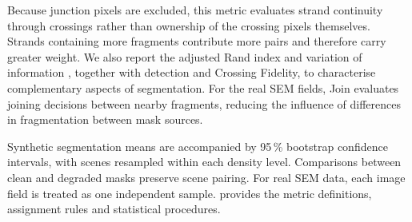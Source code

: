 Because junction pixels are excluded, this metric evaluates strand continuity
through crossings rather than ownership of the crossing pixels themselves.
Strands containing more fragments contribute more pairs and therefore carry
greater weight. We also report the adjusted Rand index and variation of
information \citep{hubert1985comparing,meila2007comparing}, together with
detection \Fone{} and Crossing Fidelity, to characterise complementary aspects
of segmentation. For the real SEM fields, Join \Fone{} evaluates joining
decisions between nearby fragments, reducing the influence of differences in
fragmentation between mask sources.

Synthetic segmentation means are accompanied by 95\,\% bootstrap
confidence intervals, with scenes resampled within each density level.
Comparisons between clean and degraded masks preserve scene pairing. For
real SEM data, each image field is treated as one independent sample.
\suppmeasures{} provides the metric definitions, assignment rules and
statistical procedures.
